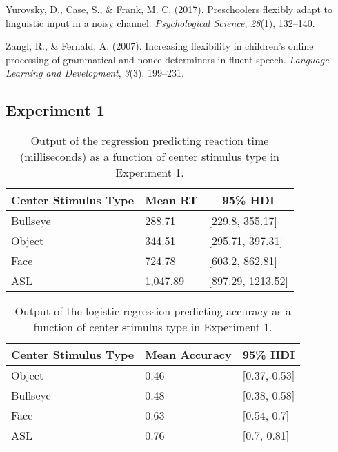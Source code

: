 \documentclass[,man,floatsintext]{apa6}
\begin{document}
\leavevmode\hypertarget{ref-yurovsky2017preschoolers}{}%
Yurovsky, D., Case, S., \& Frank, M. C. (2017). Preschoolers flexibly
adapt to linguistic input in a noisy channel. \emph{Psychological
Science}, \emph{28}(1), 132--140.

\leavevmode\hypertarget{ref-zangl2007increasing}{}%
Zangl, R., \& Fernald, A. (2007). Increasing flexibility in children's
online processing of grammatical and nonce determiners in fluent speech.
\emph{Language Learning and Development}, \emph{3}(3), 199--231.

\clearpage
\makeatletter
\efloat@restorefloats
\makeatother


\begin{appendix}
\section{Experiment 1}\label{experiment-1}

\begin{table}[h]
\begin{center}
\begin{threeparttable}
\caption{\label{tab:trio-rt-model}Output of the regression predicting reaction time (milliseconds) as a function of center stimulus type in Experiment 1.}
\begin{tabular}{lll}
\toprule
Center Stimulus Type & \multicolumn{1}{c}{Mean RT} & \multicolumn{1}{c}{95\% HDI}\\
\midrule
Bullseye & 288.71 & [229.8, 355.17]\\
Object & 344.51 & [295.71, 397.31]\\
Face & 724.78 & [603.2, 862.81]\\
ASL & 1,047.89 & [897.29, 1213.52]\\
\bottomrule
\end{tabular}
\end{threeparttable}
\end{center}
\end{table}

\begin{table}[h]
\begin{center}
\begin{threeparttable}
\caption{\label{tab:trio-acc-model}Output of the logistic regression predicting accuracy as a function of center stimulus type in Experiment 1.}
\begin{tabular}{lll}
\toprule
Center Stimulus Type & \multicolumn{1}{c}{Mean Accuracy} & \multicolumn{1}{c}{95\% HDI}\\
\midrule
Object & 0.46 & [0.37, 0.53]\\
Bullseye & 0.48 & [0.38, 0.58]\\
Face & 0.63 & [0.54, 0.7]\\
ASL & 0.76 & [0.7, 0.81]\\
\bottomrule
\end{tabular}
\end{threeparttable}
\end{center}
\end{table}


\end{appendix}
\end{document}
